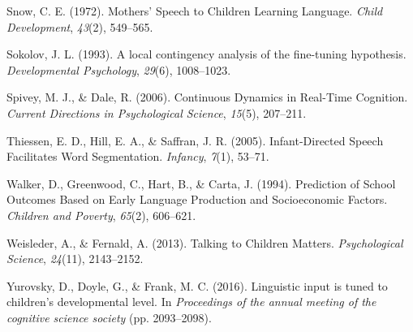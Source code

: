 \documentclass[10pt, letterpaper]{article}
\begin{document}
\leavevmode\hypertarget{ref-Snow:2018wf}{}%
Snow, C. E. (1972). Mothers' Speech to Children Learning Language.
\emph{Child Development}, \emph{43}(2), 549--565.

\leavevmode\hypertarget{ref-Sokolov:1993cr}{}%
Sokolov, J. L. (1993). A local contingency analysis of the fine-tuning
hypothesis. \emph{Developmental Psychology}, \emph{29}(6), 1008--1023.

\leavevmode\hypertarget{ref-Spivey:2006fa}{}%
Spivey, M. J., \& Dale, R. (2006). Continuous Dynamics in Real-Time
Cognition. \emph{Current Directions in Psychological Science},
\emph{15}(5), 207--211.

\leavevmode\hypertarget{ref-Thiessen:2005tx}{}%
Thiessen, E. D., Hill, E. A., \& Saffran, J. R. (2005). Infant-Directed
Speech Facilitates Word Segmentation. \emph{Infancy}, \emph{7}(1),
53--71.

\leavevmode\hypertarget{ref-Anonymous:GIFaG1Qd}{}%
Walker, D., Greenwood, C., Hart, B., \& Carta, J. (1994). Prediction of
School Outcomes Based on Early Language Production and Socioeconomic
Factors. \emph{Children and Poverty}, \emph{65}(2), 606--621.

\leavevmode\hypertarget{ref-Weisleder:2013ht}{}%
Weisleder, A., \& Fernald, A. (2013). Talking to Children Matters.
\emph{Psychological Science}, \emph{24}(11), 2143--2152.

\leavevmode\hypertarget{ref-Anonymous:r2JoRscQ}{}%
Yurovsky, D., Doyle, G., \& Frank, M. C. (2016). Linguistic input is
tuned to children's developmental level. In \emph{Proceedings of the
annual meeting of the cognitive science society} (pp. 2093--2098).


\end{document}
